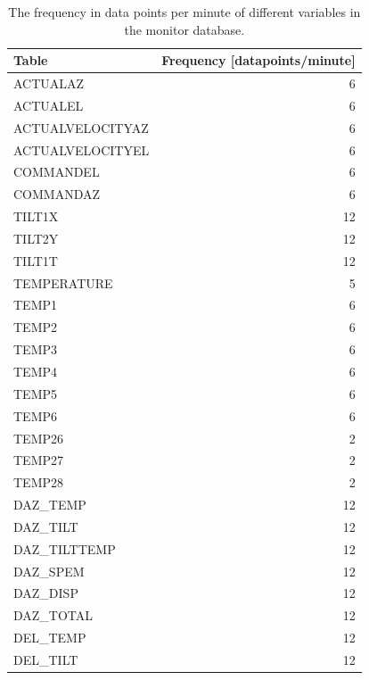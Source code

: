\begin{table}[H]
    \caption[Database frequencies]{The frequency in data points per minute of different variables in the monitor database.}
    \centering
    \begin{tabular}{lr}
        \toprule
        Table &  Frequency [datapoints/minute] \\
        \midrule
        ACTUALAZ &                    6 \\
        ACTUALEL &                    6 \\
        ACTUALVELOCITYAZ &                    6 \\
        ACTUALVELOCITYEL &                    6 \\
        COMMANDEL &                    6 \\
        COMMANDAZ &                    6 \\
        TILT1X &                   12 \\
        TILT2Y &                   12 \\
        TILT1T &                   12 \\
        TEMPERATURE &                    5 \\
        TEMP1 &                    6 \\
        TEMP2 &                    6 \\
        TEMP3 &                    6 \\
        TEMP4 &                    6 \\
        TEMP5 &                    6 \\
        TEMP6 &                    6 \\
        TEMP26 &                    2 \\
        TEMP27 &                    2 \\
        TEMP28 &                    2 \\
        DAZ\_TEMP &                   12 \\
        DAZ\_TILT &                   12 \\
        DAZ\_TILTTEMP &                   12 \\
        DAZ\_SPEM &                   12 \\
        DAZ\_DISP &                   12 \\
        DAZ\_TOTAL &                   12 \\
        DEL\_TEMP &                   12 \\
        DEL\_TILT &                   12 \\

\end{tabular}
\end{table}
